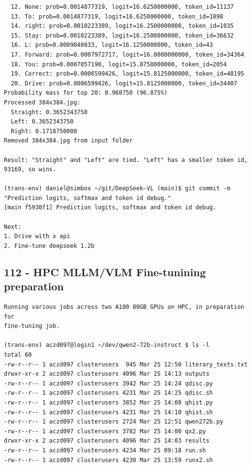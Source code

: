 \begin{verbatim}
  12. None: prob=0.0014877319, logit=16.6250000000, token_id=11137
  13. To: prob=0.0014877319, logit=16.6250000000, token_id=1898
  14. right: prob=0.0010223389, logit=16.2500000000, token_id=1035
  15. Stay: prob=0.0010223389, logit=16.2500000000, token_id=36632
  16. L: prob=0.0009040833, logit=16.1250000000, token_id=43
  17. Forward: prob=0.0007972717, logit=16.0000000000, token_id=34364
  18. You: prob=0.0007057190, logit=15.8750000000, token_id=2054
  19. Correct: prob=0.0006599426, logit=15.8125000000, token_id=40195
  20. Drive: prob=0.0006599426, logit=15.8125000000, token_id=34407
Probability mass for top 20: 0.968750 (96.875%)
Processed 384x384.jpg:
  Straight: 0.3652343750
  Left: 0.3652343750
  Right: 0.1718750000
Removed 384x384.jpg from input folder

Result: "Straight" and "Left" are tied. "Left" has a smaller token id, 93169, so wins.

(trans-env) daniel@simbox ~/git/DeepSeek-VL (main)$ git commit -m "Prediction logits, softmax and token id debug."
[main f5930f1] Prediction logits, softmax and token id debug.

Next:
1. Drive with x api
2. Fine-tune deepseek 1.2b

\end{verbatim}

\subsection{112 - HPC MLLM/VLM Fine-tunining preparation }
\label{app_res:112}

\begin{verbatim}
Running various jobs across two A100 80GB GPUs on HPC, in preparation for 
fine-tuning job.

(trans-env) aczd097@login1 ~/dev/qwen2-72b-instruct $ ls -l
total 60
-rw-r--r-- 1 aczd097 clusterusers  945 Mar 25 12:50 literary_texts.txt
drwxr-xr-x 2 aczd097 clusterusers 4096 Mar 25 14:13 outputs
-rw-r--r-- 1 aczd097 clusterusers 3942 Mar 25 14:24 qdisc.py
-rw-r--r-- 1 aczd097 clusterusers 4231 Mar 25 14:25 qdisc.sh
-rw-r--r-- 1 aczd097 clusterusers 3852 Mar 25 14:08 qhist.py
-rw-r--r-- 1 aczd097 clusterusers 4231 Mar 25 14:10 qhist.sh
-rw-r--r-- 1 aczd097 clusterusers 2724 Mar 25 12:51 qwen272b.py
-rw-r--r-- 1 aczd097 clusterusers 3782 Mar 25 14:00 qx2.py
drwxr-xr-x 2 aczd097 clusterusers 4096 Mar 25 14:03 results
-rw-r--r-- 1 aczd097 clusterusers 4234 Mar 25 09:18 run.sh
-rw-r--r-- 1 aczd097 clusterusers 4230 Mar 25 13:59 runx2.sh


\end{verbatim}

